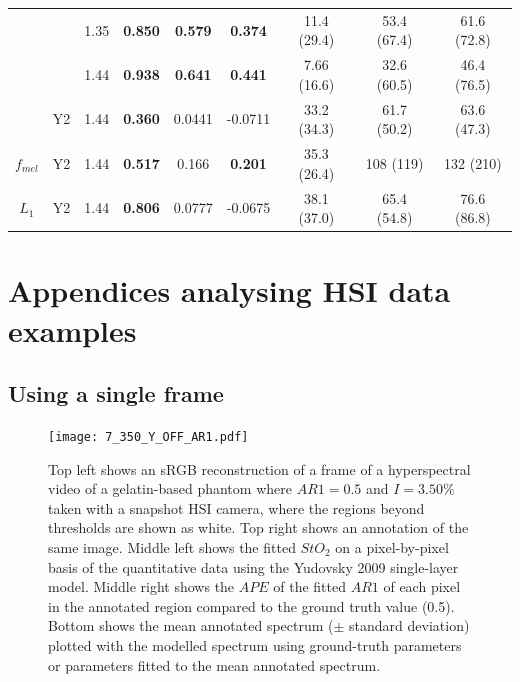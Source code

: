 \begin{subappendices}
\begin{table}[htb!]
\begin{tabular}{|ccc|ccc|ccc|}
        & & 1.35 & \textbf{0.850} & \textbf{0.579} & \textbf{0.374} & 11.4 (29.4) & 53.4 (67.4) & 61.6 (72.8) \\
        & & 1.44 & \textbf{0.938} & \textbf{0.641} & \textbf{0.441} & 7.66 (16.6) & 32.6 (60.5) & 46.4 (76.5) \\
        \cline{2-9}
        & Y2 & 1.44 & \textbf{0.360} & 0.0441 & -0.0711 & 33.2 (34.3) & 61.7 (50.2) & 63.6 (47.3) \\
        \hline
        $f_{mel}$ & Y2 & 1.44 & \textbf{0.517} & 0.166 & \textbf{0.201} & 35.3 (26.4) & 108 (119) & 132 (210) \\
        \hline
        $L_1$ & Y2 & 1.44 & \textbf{0.806} & 0.0777 & -0.0675 & 38.1 (37.0) & 65.4 (54.8) & 76.6 (86.8) \\
        \hline
    \end{tabular}    
    \label{ap:backwardsHSIMCr}
\end{table}
\FloatBarrier
\section{Appendices analysing HSI data examples}\label{ap:MoreHSIPhantomEgs}
\subsection{Using a single frame}
\begin{figure}[h!]
    \centering 
    \texttt{[image: 7\_350\_Y\_OFF\_AR1.pdf]}
    \caption{Top left shows an sRGB reconstruction of a frame of a hyperspectral video of a gelatin-based phantom where $AR1=0.5$ and $I=3.50\%$ taken with a snapshot HSI camera, where the regions beyond thresholds are shown as white. Top right shows an annotation of the same image. Middle left shows the fitted $StO_2$ on a pixel-by-pixel basis of the quantitative data using the Yudovsky 2009 single-layer model. Middle right shows the $APE$ of the fitted $AR1$ of each pixel in the annotated region compared to the ground truth value (0.5). Bottom shows the mean annotated spectrum ($\pm$ standard deviation) plotted with the modelled spectrum using ground-truth parameters or parameters fitted to the mean annotated spectrum.}
    \label{ap:gelatinpbpegQY}
\end{figure}


\end{subappendices}
